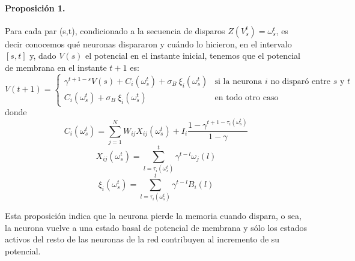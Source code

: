 \paragraph{Proposición 1.} Para cada par (s,t), condicionado a la secuencia de disparos  $Z(V_s^t)=\omega_s^t$, es decir conocemos qué neuronas dispararon y cuándo lo hicieron, en el intervalo $[s,t]$ y, dado $V(s)$ el potencial en el instante inicial, tenemos que el potencial de membrana en el instante $t+1$ es:
\begin{equation}
    V(t+1) = \left\{ \begin{array}{ll}
        \gamma^{t+1-s} V(s) + C_i(\omega_s^t) + \sigma_B \  \xi_i(\omega_s^t)   & \text{si la neurona } i \text{ no disparó entre } s \text{ y } t\\ 
        C_i(\omega_s^t) + \sigma_B \ \xi_i(\omega_s^t)  & \text{en todo otro caso}
    \end{array}\right.
    \label{eqn:potencialDef}
\end{equation}
donde
\begin{equation}
     C_i(\omega_s^t) = \sum_{j=1}^N W_{ij} X_{ij}(\omega_s^t) + I_i \frac{1-\gamma^{t+1-\tau_i(\omega_s^t) }}{1-\gamma}
\end{equation}
\begin{equation}
    X_{ij}(\omega_s^t) = \sum_{l=\tau_i(\omega_s^t)}^t \gamma^{t-l} \omega_j(l)
    \label{eqn:Xij1}
\end{equation}
\begin{equation}
    \xi_i(\omega_s^t) = \sum_{l=\tau_i(\omega_s^t)}^t \gamma^{t-l} B_i(l)
\end{equation}

Esta proposición indica que la neurona pierde la memoria cuando dispara, o sea, la neurona vuelve a una estado basal de potencial de membrana y sólo los estados activos del resto de las neuronas de la red contribuyen al incremento de su potencial. 


